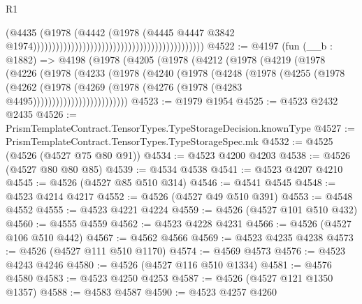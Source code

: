 \begin{lexlean}{R1}
\begin{coremodule}
                                                                                    (@4435
                                                                                      (@1978
                                                                                        (@4442
                                                                                          (@1978
                                                                                            (@4445
                                                                                              @4447
                                                                                              @3842
                                                                                              @1974)))))))))))))))))))))))))))))))))))))))))))))
@4522 := @4197
    (fun (__b : @1882) =>
    @4198
      (@1978
        (@4205
          (@1978
            (@4212
              (@1978
                (@4219
                  (@1978
                    (@4226
                      (@1978
                        (@4233
                          (@1978
                            (@4240
                              (@1978
                                (@4248
                                  (@1978
                                    (@4255
                                      (@1978
                                        (@4262
                                          (@1978
                                            (@4269
                                              (@1978
                                                (@4276 (@1978 (@4283 @4495)))))))))))))))))))))))))
@4523 := @1979 @1954
@4525 := @4523 @2432 @2435
@4526 := PrismTemplateContract.TensorTypes.TypeStorageDecision.knownType
@4527 := PrismTemplateContract.TensorTypes.TypeStorageSpec.mk
@4532 := @4525 (@4526 (@4527 @75 @80 @91))
@4534 := @4523 @4200 @4203
@4538 := @4526 (@4527 @80 @80 @85)
@4539 := @4534 @4538
@4541 := @4523 @4207 @4210
@4545 := @4526 (@4527 @85 @510 @314)
@4546 := @4541 @4545
@4548 := @4523 @4214 @4217
@4552 := @4526 (@4527 @49 @510 @391)
@4553 := @4548 @4552
@4555 := @4523 @4221 @4224
@4559 := @4526 (@4527 @101 @510 @432)
@4560 := @4555 @4559
@4562 := @4523 @4228 @4231
@4566 := @4526 (@4527 @106 @510 @442)
@4567 := @4562 @4566
@4569 := @4523 @4235 @4238
@4573 := @4526 (@4527 @111 @510 @1170)
@4574 := @4569 @4573
@4576 := @4523 @4243 @4246
@4580 := @4526 (@4527 @116 @510 @1334)
@4581 := @4576 @4580
@4583 := @4523 @4250 @4253
@4587 := @4526 (@4527 @121 @1350 @1357)
@4588 := @4583 @4587
@4590 := @4523 @4257 @4260

\end{coremodule}
\end{lexlean}
